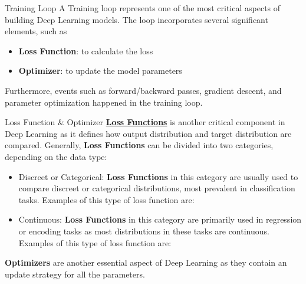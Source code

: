 \documentclass{beamer}
\begin{document}
\begin{frame}[fragile]{Training Loop}
    A Training loop represents one of the most critical aspects of building Deep Learning models. The loop incorporates several significant elements, such as
    \begin{itemize}
        \item \textbf{Loss Function}: to calculate the loss
        \item \textbf{Optimizer}: to update the model parameters
    \end{itemize}
    Furthermore, events such as forward/backward passes, gradient descent, and parameter optimization happened in the training loop.
\end{frame}
\begin{frame}[fragile]{Loss Function \& Optimizer}
    \href{https://pytorch.org/docs/stable/nn.html#loss-functions}{\textbf{Loss Functions}} is another critical component in Deep Learning as it defines how output distribution and target distribution are compared. Generally, \textbf{Loss Functions} can be divided into two categories, depending on the data type:
    \begin{itemize}
        \item Discreet or Categorical: \textbf{Loss Functions} in this category are usually used to compare discreet or categorical distributions, most prevalent in classification tasks. Examples of this type of loss function are:
        \item Continuous: \textbf{Loss Functions} in this category are primarily used in regression or encoding tasks as most distributions in these tasks are continuous. Examples of this type of loss function are:
    \end{itemize}
    {\textbf{Optimizers}} are another essential aspect of Deep Learning as they contain an update strategy for all the parameters.
\end{frame}
\end{document}
